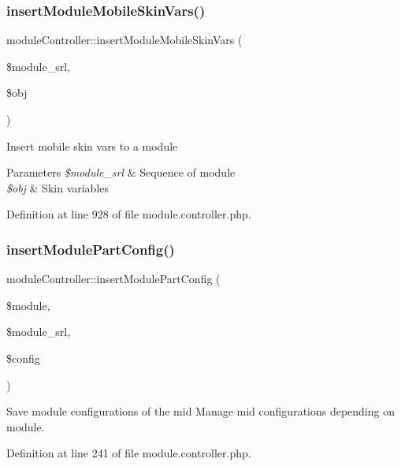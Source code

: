 \subsubsection{\texorpdfstring{insert\+Module\+Mobile\+Skin\+Vars()}{insertModuleMobileSkinVars()}}
{\footnotesize\ttfamily module\+Controller\+::insert\+Module\+Mobile\+Skin\+Vars (\begin{DoxyParamCaption}\item[{}]{\$module\+\_\+srl,  }\item[{}]{\$obj }\end{DoxyParamCaption})}

Insert mobile skin vars to a module 
\begin{DoxyParams}{Parameters}
{\em \$module\+\_\+srl} & Sequence of module \\
\hline
{\em \$obj} & Skin variables \\
\hline
\end{DoxyParams}


Definition at line 928 of file module.\+controller.\+php.

\mbox{\label{classmoduleController_a7def19c7b7f3f3e0d97a2183d58d62eb}} 
\subsubsection{\texorpdfstring{insert\+Module\+Part\+Config()}{insertModulePartConfig()}}
{\footnotesize\ttfamily module\+Controller\+::insert\+Module\+Part\+Config (\begin{DoxyParamCaption}\item[{}]{\$module,  }\item[{}]{\$module\+\_\+srl,  }\item[{}]{\$config }\end{DoxyParamCaption})}



Save module configurations of the mid Manage mid configurations depending on module. 



Definition at line 241 of file module.\+controller.\+php.

\mbox{\label{classmoduleController_ad044df4dde2053b5dcbaf5077822290c}} 
